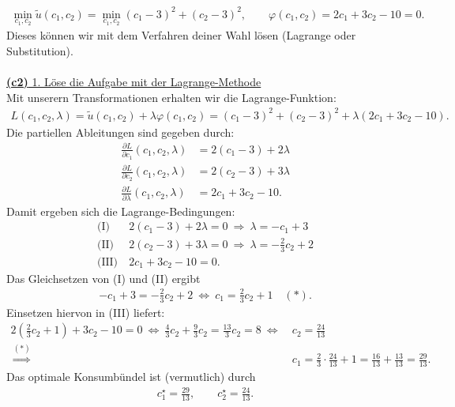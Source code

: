 \begin{align*}
	\min \limits_{c_1,c_2}
	\tilde{u}(c_1,c_2)
	=
	\min \limits_{c_1,c_2} (c_1 -3)^2 + (c_2-3)^2
	, \qquad \varphi(c_1,c_2) = 2 c_1 + 3c_2 - 10= 0.
\end{align*}
Dieses können wir mit dem Verfahren deiner Wahl lösen (Lagrange oder Substitution).\\
\\
\underline{\textbf{(c2)} 1. Löse die Aufgabe mit der Lagrange-Methode}\\
Mit unserern Transformationen erhalten wir die Lagrange-Funktion:
\begin{align*}
	L(c_1,c_2,\lambda)
	=
	\tilde{u}(c_1,c_2) + \lambda \varphi(c_1,c_2)
	=
	(c_1-3)^2 + (c_2-3)^2 + \lambda ( 2c_1 + 3 c_2 -10).
\end{align*}
Die partiellen Ableitungen sind gegeben durch:
\begin{align*}
	\frac{\partial L}{\partial c_1}(c_1, c_2 , \lambda)
	&= 2(c_1 -3) + 2 \lambda\\
	\frac{\partial L}{\partial c_2}(c_1, c_2 , \lambda)
	&= 2(c_2 -3) + 3 \lambda \\
	\frac{\partial L}{\partial \lambda}(c_1, c_2 , \lambda)
	&= 2 c_1 + 3 c_2 - 10 .
\end{align*}
Damit ergeben sich die Lagrange-Bedingungen:
\begin{align*}
	\text{(I)} &\ 2(c_1 -3) + 2 \lambda = 0 
	\ \Rightarrow \
	\lambda = - c_1 + 3	\\
	\text{(II)} &\ 2(c_2 -3) + 3 \lambda  = 0
	\ \Rightarrow \
	\lambda = - \frac{2}{3} c_2 + 2
	\\
	\text{(III)} &\ 2 c_1 + 3 c_2 - 10 = 0.
\end{align*}
Das Gleichsetzen von (I) und (II) ergibt
\begin{align*}
	-c_1 + 3 = - \frac{2}{3} c_2 +2
	\ \Leftrightarrow \
	c_1 = \frac{2}{3} c_2 +1 \quad (\ast) .
\end{align*}
Einsetzen hiervon in (III) liefert:
\begin{align*}
	2 \left(\frac{2}{3}c_2 + 1\right) + 3 c_2 - 10 = 0
	\ \Leftrightarrow \
	\frac{4}{3} c_2 + \frac{9 }{3} c_2 = \frac{13}{3} c_2 = 8 
	\ \Leftrightarrow \
	&c_2 = \frac{24}{13}\\ 
	\
	\overset{(\ast)}{\Rightarrow}
	&c_1 = \frac{2}{3} \cdot\frac{24}{13} + 1
	= \frac{16}{13} + \frac{13}{13} = \frac{29}{13}.
\end{align*}
Das optimale Konsumbündel ist (vermutlich) durch
\begin{align*}
	c_1^\star = \frac{29}{13}, \qquad 
	c_2^\star = \frac{24}{13}.
\end{align*}
